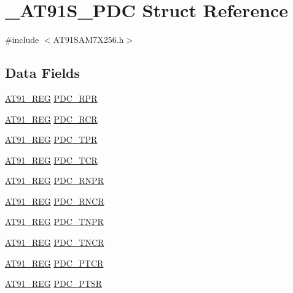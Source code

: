 \hypertarget{struct__AT91S__PDC}{\section{\-\_\-\-A\-T91\-S\-\_\-\-P\-D\-C Struct Reference}
\label{struct__AT91S__PDC}
}


{\ttfamily \#include $<$A\-T91\-S\-A\-M7\-X256.\-h$>$}

\subsection*{Data Fields}
\begin{DoxyCompactItemize}
\item 
\hyperlink{GCC_2ARM7__AT91SAM7S_2AT91SAM7X256_8h_a712ad5a1ac1bd02f3e95a7526c283ce1}{A\-T91\-\_\-\-R\-E\-G} \hyperlink{struct__AT91S__PDC_a96c8c767475f69faf5c83cbac1690102}{P\-D\-C\-\_\-\-R\-P\-R}
\item 
\hyperlink{GCC_2ARM7__AT91SAM7S_2AT91SAM7X256_8h_a712ad5a1ac1bd02f3e95a7526c283ce1}{A\-T91\-\_\-\-R\-E\-G} \hyperlink{struct__AT91S__PDC_ad1688f602dd1c369fc1604c51cc05c2f}{P\-D\-C\-\_\-\-R\-C\-R}
\item 
\hyperlink{GCC_2ARM7__AT91SAM7S_2AT91SAM7X256_8h_a712ad5a1ac1bd02f3e95a7526c283ce1}{A\-T91\-\_\-\-R\-E\-G} \hyperlink{struct__AT91S__PDC_a15d473588119af649205c986be0e6639}{P\-D\-C\-\_\-\-T\-P\-R}
\item 
\hyperlink{GCC_2ARM7__AT91SAM7S_2AT91SAM7X256_8h_a712ad5a1ac1bd02f3e95a7526c283ce1}{A\-T91\-\_\-\-R\-E\-G} \hyperlink{struct__AT91S__PDC_a9e2a379cc2a8a64b215de556a0ba8b2e}{P\-D\-C\-\_\-\-T\-C\-R}
\item 
\hyperlink{GCC_2ARM7__AT91SAM7S_2AT91SAM7X256_8h_a712ad5a1ac1bd02f3e95a7526c283ce1}{A\-T91\-\_\-\-R\-E\-G} \hyperlink{struct__AT91S__PDC_a6454ec358a78c11a66179bb97832f2d3}{P\-D\-C\-\_\-\-R\-N\-P\-R}
\item 
\hyperlink{GCC_2ARM7__AT91SAM7S_2AT91SAM7X256_8h_a712ad5a1ac1bd02f3e95a7526c283ce1}{A\-T91\-\_\-\-R\-E\-G} \hyperlink{struct__AT91S__PDC_ad63bbe1f7711aa4b34853bbbe75d6104}{P\-D\-C\-\_\-\-R\-N\-C\-R}
\item 
\hyperlink{GCC_2ARM7__AT91SAM7S_2AT91SAM7X256_8h_a712ad5a1ac1bd02f3e95a7526c283ce1}{A\-T91\-\_\-\-R\-E\-G} \hyperlink{struct__AT91S__PDC_a21220f0508a5ec5c7737a82afa89dc35}{P\-D\-C\-\_\-\-T\-N\-P\-R}
\item 
\hyperlink{GCC_2ARM7__AT91SAM7S_2AT91SAM7X256_8h_a712ad5a1ac1bd02f3e95a7526c283ce1}{A\-T91\-\_\-\-R\-E\-G} \hyperlink{struct__AT91S__PDC_a4b2288712d4b7e04c414ad20d302915d}{P\-D\-C\-\_\-\-T\-N\-C\-R}
\item 
\hyperlink{GCC_2ARM7__AT91SAM7S_2AT91SAM7X256_8h_a712ad5a1ac1bd02f3e95a7526c283ce1}{A\-T91\-\_\-\-R\-E\-G} \hyperlink{struct__AT91S__PDC_af54cc3edd8cf870f581ca7f598e2e9ba}{P\-D\-C\-\_\-\-P\-T\-C\-R}
\item 
\hyperlink{GCC_2ARM7__AT91SAM7S_2AT91SAM7X256_8h_a712ad5a1ac1bd02f3e95a7526c283ce1}{A\-T91\-\_\-\-R\-E\-G} \hyperlink{struct__AT91S__PDC_a534356e87aed2a4f5c6e1c4370f4afcf}{P\-D\-C\-\_\-\-P\-T\-S\-R}
\end{DoxyCompactItemize}


